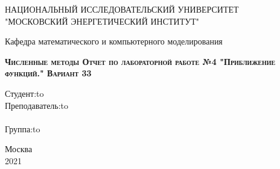 \begin{titlepage}
	\newpage

	\begin{center}
	НАЦИОНАЛЬНЫЙ ИССЛЕДОВАТЕЛЬСКИЙ УНИВЕРСИТЕТ\\
		"МОСКОВСКИЙ ЭНЕРГЕТИЧЕСКИЙ ИНСТИТУТ"\\
	\end{center}

	\vspace{8em}	

	\begin{center}
		\Large Кафедра математического и компьютерного моделирования\\ 
	\end{center}

	\vspace{2em}

	\begin{center}
		\textsc{\textbf{ \Large Численные методы \linebreak Отчет по лабораторной работе №4 \linebreak "Приближение функций." \linebreak Вариант 33}}
	\end{center}

	\vspace{6em}



	\newbox{\lbox}
	\newlength{\maxl}
	\setlength{\maxl}{\wd\lbox}
	\hfill\parbox{11cm}{
		\hspace*{5cm}\hspace*{-5cm}Студент:\hfill\hbox to\\
		\hspace*{5cm}\hspace*{-5cm}Преподаватель:\hfill\hbox to\\
		\\
		\hspace*{5cm}\hspace*{-5cm}Группа:\hfill\hbox to\\
	}


	\vspace{\fill}

	\begin{center}
		Москва \\2021
	\end{center}

\end{titlepage}
